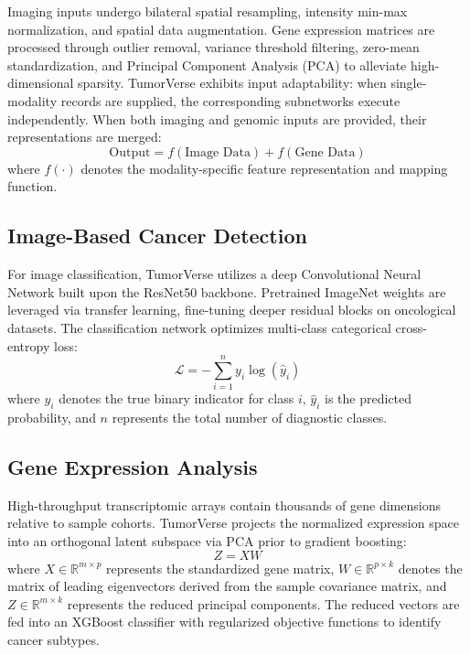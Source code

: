 \documentclass[conference]{IEEEtran}
\begin{document}
Imaging inputs undergo bilateral spatial resampling, intensity min-max normalization, and spatial data augmentation. Gene expression matrices are processed through outlier removal, variance threshold filtering, zero-mean standardization, and Principal Component Analysis (PCA) to alleviate high-dimensional sparsity. TumorVerse exhibits input adaptability: when single-modality records are supplied, the corresponding subnetworks execute independently. When both imaging and genomic inputs are provided, their representations are merged:
\begin{equation}
\text{Output} = f(\text{Image Data}) + f(\text{Gene Data})
\label{eq:multimodal}
\end{equation}
where $f(\cdot)$ denotes the modality-specific feature representation and mapping function.

\subsection{Image-Based Cancer Detection}
For image classification, TumorVerse utilizes a deep Convolutional Neural Network built upon the ResNet50 backbone. Pretrained ImageNet weights are leveraged via transfer learning, fine-tuning deeper residual blocks on oncological datasets. The classification network optimizes multi-class categorical cross-entropy loss:
\begin{equation}
\mathcal{L} = -\sum_{i=1}^n y_i \log(\hat{y}_i)
\label{eq:crossentropy}
\end{equation}
where $y_i$ denotes the true binary indicator for class $i$, $\hat{y}_i$ is the predicted probability, and $n$ represents the total number of diagnostic classes.

\subsection{Gene Expression Analysis}
High-throughput transcriptomic arrays contain thousands of gene dimensions relative to sample cohorts. TumorVerse projects the normalized expression space into an orthogonal latent subspace via PCA prior to gradient boosting:
\begin{equation}
Z = X W
\label{eq:pca}
\end{equation}
where $X \in \mathbb{R}^{m \times p}$ represents the standardized gene matrix, $W \in \mathbb{R}^{p \times k}$ denotes the matrix of leading eigenvectors derived from the sample covariance matrix, and $Z \in \mathbb{R}^{m \times k}$ represents the reduced principal components. The reduced vectors are fed into an XGBoost classifier with regularized objective functions to identify cancer subtypes.
\end{document}
